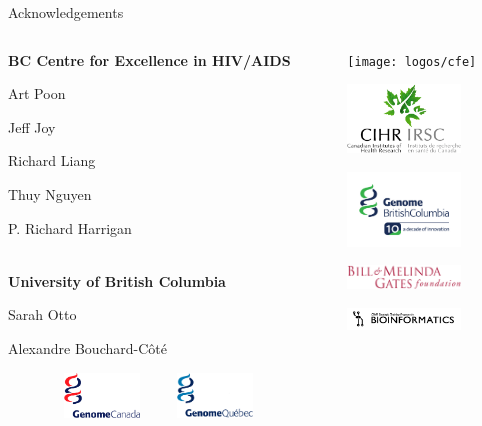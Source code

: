 \documentclass{beamer}
\begin{document}
\begin{frame}{Acknowledgements}
  \begin{columns}
    \begin{column}{0.6\textwidth}

      \textbf{BC Centre for Excellence in HIV/AIDS}

      Art Poon

      Jeff Joy

      Richard Liang

      Thuy Nguyen

      P. Richard Harrigan

      \hfill\\
      \textbf{University of British Columbia}

      Sarah Otto

      Alexandre Bouchard-C\^ot\'e

      \vfill
      \vspace{0.5cm}
      $\qquad\qquad$\includegraphics[width=2cm]{logos/genomecanada}
      $\qquad$
      \includegraphics[width=2cm]{logos/genomequebec}
    \end{column}
    \begin{column}{0.4\textwidth}
      \centering 

      \texttt{[image: logos/cfe]}
      \vspace{0.5cm}

      \includegraphics[width=3cm]{logos/cihr}

      \includegraphics[width=3cm]{logos/genomebc}

      \includegraphics[width=3cm]{logos/bmgf}
      \vspace{0.5cm}

      \includegraphics[width=3cm]{logos/btp}
    \end{column}
  \end{columns}
\end{frame}
\end{document}
